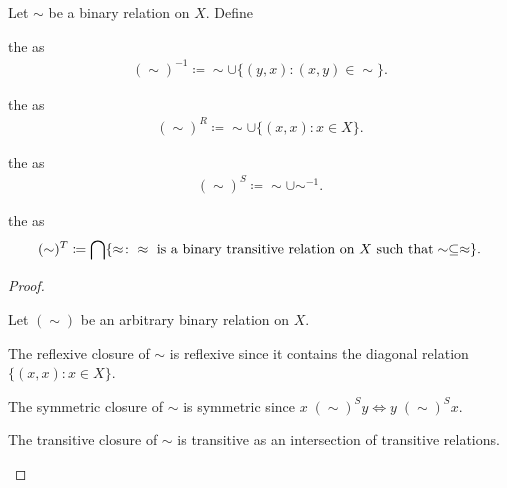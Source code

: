 \begin{definition}\label{def:derived_relations}
  Let \( \sim \) be a binary relation on \( X \). Define
  \begin{defenum}
    \item\label{def:derived_relations/converse} the  as
    \begin{align*}
      (\sim)^{-1} \coloneqq \sim \cup \{ (y, x) \colon (x, y) \in \sim \}.
    \end{align*}

    \item\label{def:derived_relations/reflexive} the  as
    \begin{align*}
      (\sim)^R \coloneqq \sim \cup \{ (x, x) \colon x \in X \}.
    \end{align*}

    \item\label{def:derived_relations/symmetric} the  as
    \begin{align*}
      (\sim)^S \coloneqq \sim \cup \sim^{-1}.
    \end{align*}

    \item\label{def:derived_relations/transitive} the  as
    \begin{align*}
      (\sim)^T \coloneqq \bigcap \{ \approx \colon \approx \text{ is a binary transitive relation on \( X \) such that} \sim \subseteq \approx \}.
    \end{align*}
  \end{defenum}
\end{definition}
\begin{proof}
\begin{itemize}
  Let \( (\sim) \) be an arbitrary binary relation on \( X \).

  \begin{description}
     The reflexive closure of \( \sim \) is reflexive since it contains the diagonal relation \( \{ (x, x) \colon x \in X \} \).

     The symmetric closure of \( \sim \) is symmetric since \( x \;(\sim)^S y \iff y \;(\sim)^S x \).

     The transitive closure of \( \sim \) is transitive as an intersection of transitive relations.
  \end{description}
\end{itemize}
\end{proof}
